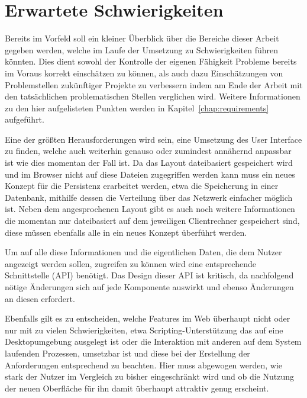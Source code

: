 \section{Erwartete Schwierigkeiten}
Bereits im Vorfeld soll ein kleiner Überblick über die Bereiche dieser Arbeit gegeben werden, welche im Laufe der Umsetzung zu Schwierigkeiten führen könnten. Dies dient sowohl der Kontrolle der eigenen Fähigkeit Probleme bereits im Voraus korrekt einschätzen zu können, als auch dazu Einschätzungen von Problemstellen zukünftiger Projekte zu verbessern indem am Ende der Arbeit mit den tatsächlichen problematischen Stellen verglichen wird. Weitere Informationen zu den hier aufgelisteten Punkten werden in Kapitel~\ref{chap:requirements} aufgeführt.

Eine der größten Herausforderungen wird sein, eine Umsetzung des User Interface zu finden, welche auch weiterhin genauso oder zumindest annähernd anpassbar ist wie dies momentan der Fall ist. Da das Layout dateibasiert gespeichert wird und im Browser nicht auf diese Dateien zugegriffen werden kann muss ein neues Konzept für die Persistenz erarbeitet werden, etwa die Speicherung in einer Datenbank, mithilfe dessen die Verteilung über das Netzwerk einfacher möglich ist. 
Neben dem angesprochenen Layout gibt es auch noch weitere Informationen die momentan nur dateibasiert auf dem jeweiligen Clientrechner gespeichert sind, diese müssen ebenfalls alle in ein neues Konzept überführt werden.

Um auf alle diese Informationen und die eigentlichen Daten, die dem Nutzer angezeigt werden sollen, zugreifen zu können wird eine entsprechende Schnittstelle (API) benötigt. Das Design dieser API ist kritisch, da nachfolgend nötige Änderungen sich auf jede Komponente auswirkt und ebenso Änderungen an diesen erfordert. 

Ebenfalls gilt es zu entscheiden, welche Features im Web überhaupt nicht oder nur mit zu vielen Schwierigkeiten, etwa Scripting-Unterstützung das auf eine Desktopumgebung ausgelegt ist oder die Interaktion mit anderen auf dem System laufenden Prozessen, umsetzbar ist und diese bei der Erstellung der Anforderungen entsprechend zu beachten. Hier muss abgewogen werden, wie stark der Nutzer im Vergleich zu bisher eingeschränkt wird und ob die Nutzung der neuen Oberfläche für ihn damit überhaupt attraktiv genug erscheint.

